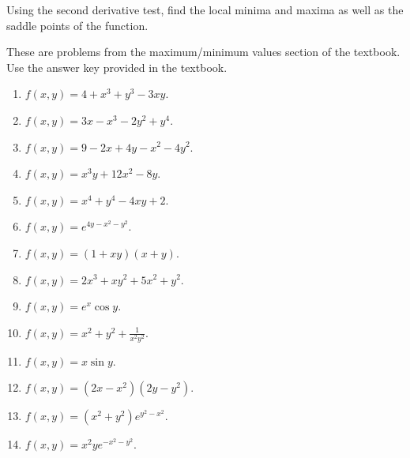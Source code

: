 Using the second derivative test, find the local minima and maxima as well as the saddle points of the function.


These are problems from the maximum/minimum values section of the textbook. Use the answer key provided in the textbook.


\begin{enumerate}
\item $f(x,y)= 4+x^3+y^3-3x y$.
\item $f(x,y)= 3x-x^3-2y^2+y^4$.
\item $f(x,y)= 9-2x +4y- x^2 -4 y^2 $.
\item $f(x,y)= x^3y+12x^2-8y$.
\item $f(x,y)= x^4+y^4-4x y+2$.
\item $f(x,y)=e^{4y-x^2-y^2}$.
\item $f(x,y)=(1+x y)(x+y)$.
\item $f(x,y)=2x^3+x y^2+ 5x^2 + y^2 $.
\item $f(x,y)=e^x\cos y$.
\item $f(x,y) =x^2+ y^2+ \frac{ 1}{ x^2y^2}$.
\item $f(x,y)=x\sin y$.
\item $f(x,y)=(2x-x^2)(2y-y^2)$.
\item $f(x,y)=(x^2+y^2)e^{y^2- x^2 }$.
\item $f(x,y)=x^2y e^{-x^2-y^2}$.
\end{enumerate}